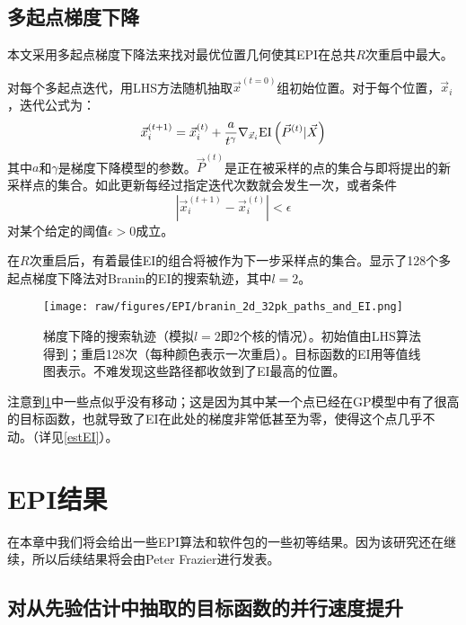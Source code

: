 \documentclass[index]{subfiles}
\begin{document}
\subsection{多起点梯度下降}
\label{sec:multistart}

本文采用多起点梯度下降法来找对最优位置几何使其EPI在总共$R$次重启中最大。

对每个多起点迭代，用LHS方法随机抽取$\vec{x}^{(t=0)}$组初始位置。对于每个位置，$\vec{x}_{i}$，迭代公式为：
\begin{equation}
    \vec{x}_{i}^{(t+1)} = \vec{x}_{i}^{(t)} + \frac{a}{t^{\gamma}} \nabla_{\vec{x}_{i}} {\rm EI}\left(\vec{P}^{(t)} | \vec{X}\right)
\end{equation}
其中$a$和$\gamma$是梯度下降模型的参数。$\vec{P}^{(t)}$是正在被采样的点的集合与即将提出的新采样点的集合。如此更新每经过指定迭代次数就会发生一次，或者条件
\begin{equation}
    \left|\vec{x}_{i}^{(t+1)} - \vec{x}_{i}^{(t)}\right| < \epsilon
\end{equation}
对某个给定的阈值$\epsilon > 0$成立。

在$R$次重启后，有着最佳EI的组合将被作为下一步采样点的集合。显示了128个多起点梯度下降法对Branin的EI的搜索轨迹，其中$l = 2$。

\begin{figure}[hpt]
 	\centerline{\texttt{[image: raw/figures/EPI/branin\_2d\_32pk\_paths\_and\_EI.png]}}
    \caption[Branin的梯度下降搜索轨迹]{梯度下降的搜索轨迹（模拟$l=2$即2个核的情况）。初始值由LHS算法得到；重启128次（每种颜色表示一次重启）。目标函数的EI用等值线图表示。不难发现这些路径都收敛到了EI最高的位置。}
 	\label{fig:pk_paths}
 \end{figure}

注意到\cref{fig:pk_paths}中一些点似乎没有移动；这是因为其中某一个点已经在GP模型中有了很高的目标函数，也就导致了EI在此处的梯度非常低甚至为零，使得这个点几乎不动。（详见\cref{estEI}）。



\section{EPI结果} %
\label{cha:EPI Results}

在本章中我们将会给出一些EPI算法和软件包的一些初等结果。因为该研究还在继续，所以后续结果将会由Peter Frazier进行发表。


\subsection{对从先验估计中抽取的目标函数的并行速度提升}
\end{document}
